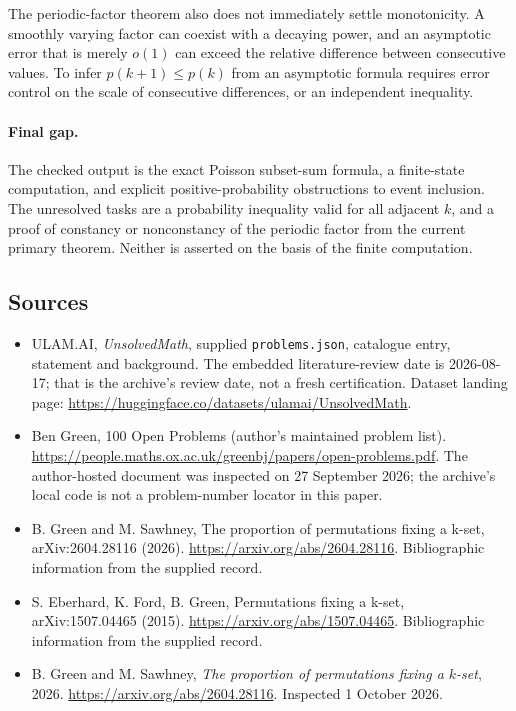 \documentclass[11pt,a4paper]{article}
\begin{document}
The periodic-factor theorem also does not immediately settle monotonicity. A smoothly varying factor can coexist with a decaying power, and an asymptotic error that is merely $o(1)$ can exceed the relative difference between consecutive values. To infer $p(k+1)\leq p(k)$ from an asymptotic formula requires error control on the scale of consecutive differences, or an independent inequality.

\paragraph{Final gap.}
The checked output is the exact Poisson subset-sum formula, a finite-state computation, and explicit positive-probability obstructions to event inclusion. The unresolved tasks are a probability inequality valid for all adjacent $k$, and a proof of constancy or nonconstancy of the periodic factor from the current primary theorem. Neither is asserted on the basis of the finite computation.

\subsection{Sources}

{\small

\begin{itemize}

\item[\hypertarget{source:statement:1}{S1}] ULAM.AI, \emph{UnsolvedMath}, supplied \texttt{problems.json}, catalogue entry, statement and background. The embedded literature-review date is 2026-08-17; that is the archive’s review date, not a fresh certification. Dataset landing page: \url{https://huggingface.co/datasets/ulamai/UnsolvedMath}.

\item[\hypertarget{source:statement:2}{S2}] Ben Green, 100 Open Problems (author’s maintained problem list). \url{https://people.maths.ox.ac.uk/greenbj/papers/open-problems.pdf}. The author-hosted document was inspected on 27 September 2026; the archive’s local code is not a problem-number locator in this paper.

\item[\hypertarget{source:statement:3}{S3}] B. Green and M. Sawhney, The proportion of permutations fixing a k-set, arXiv:2604.28116 (2026). \url{https://arxiv.org/abs/2604.28116}. Bibliographic information from the supplied record.

\item[\hypertarget{source:statement:4}{S4}] S. Eberhard, K. Ford, B. Green, Permutations fixing a k-set, arXiv:1507.04465 (2015). \url{https://arxiv.org/abs/1507.04465}. Bibliographic information from the supplied record.

\item[E1] B. Green and M. Sawhney, \emph{The proportion of permutations fixing a $k$-set}, 2026. \url{https://arxiv.org/abs/2604.28116}. Inspected 1 October 2026.

\end{itemize}

}

\label{end:statement}
\end{document}
